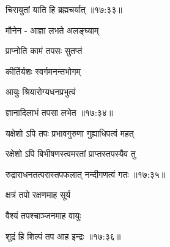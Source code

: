 {\devanagarifontbold चिरायुतां याति हि ब्रह्मचर्यात् {॥१७:३३॥} \veg\dontdisplaylinenum }%
 
\ujvers{}

\nemslokab

{\devanagarifontbold मौनेन - आज्ञा लभते अलङ्घ्याम्  \danda\dontdisplaylinenum }%
 
\nemslokac

{\devanagarifontbold प्राप्नोति कामं तपसः सुतप्तं }%
  \dontdisplaylinenum

\nemslokab

{\devanagarifontbold कीर्तिर्यशः स्वर्गमनन्तभोगम्  \danda\dontdisplaylinenum }%
 
\nemslokae

{\devanagarifontbold आयुः श्रियारोग्यधनप्रभुत्वं }%
  \dontdisplaylinenum

\nemslokad

{\devanagarifontbold ज्ञानादिलाभं तपसा लभेत {॥१७:३४॥} \veg\dontdisplaylinenum }%
 
\ujvers{}

\nemslokab

{\devanagarifontbold यक्षेशो ऽपि तपः प्रभावगुरुणा गुह्याधिपत्वं महत्  \danda\dontdisplaylinenum }%
 
\nemslokac

{\devanagarifontbold रक्षेशो ऽपि बिभीषणस्त्वमरतां प्राप्तस्तपस्यैव तु }%
  \dontdisplaylinenum

\nemslokad

{\devanagarifontbold रुद्राराधनतत्परास्तपफलात् नन्दीगणत्वं गतः {॥१७:३५॥} \veg\dontdisplaylinenum }%
 
\ujvers{}

\nemslokab

{\devanagarifontbold क्षत्रं तपो रक्षणमाह सूर्य  \danda\dontdisplaylinenum }%
 
\nemslokac

{\devanagarifontbold वैश्यं तपश्चाञ्जनमाह वायुः }%
  \dontdisplaylinenum

\nemslokad

{\devanagarifontbold शूद्रं हि शिल्पं तप आह इन्द्रः {॥१७:३६॥} \veg\dontdisplaylinenum }%
 
\ujvers{}

